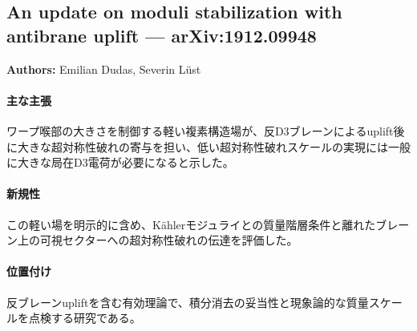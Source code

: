 \subsection{An update on moduli stabilization with antibrane uplift --- arXiv:1912.09948}

\textbf{Authors:} Emilian Dudas, Severin L\"ust

\paragraph{主な主張}
ワープ喉部の大きさを制御する軽い複素構造場が、反D3ブレーンによるuplift後に大きな超対称性破れの寄与を担い、低い超対称性破れスケールの実現には一般に大きな局在D3電荷が必要になると示した。 \cite{Dudas:2019pls}

\paragraph{新規性}
この軽い場を明示的に含め、K\"ahlerモジュライとの質量階層条件と離れたブレーン上の可視セクターへの超対称性破れの伝達を評価した。

\paragraph{位置付け}
反ブレーンupliftを含む有効理論で、積分消去の妥当性と現象論的な質量スケールを点検する研究である。
